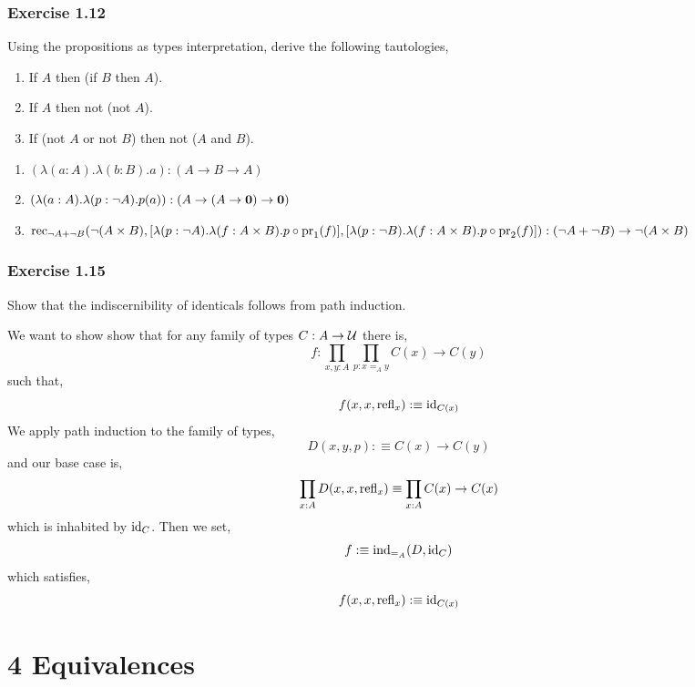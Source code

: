 \documentclass[12pt]{article}
\begin{document}
\subsubsection{Exercise 1.12}

\begin{exercise}
Using the propositions as types interpretation, derive the following tautologies,
\begin{enumerate}
\item If $A$ then (if $B$ then $A$).
\item If $A$ then not (not $A$).
\item If (not $A$ or not $B$) then not ($A$ and $B$).
\end{enumerate}
\end{exercise}

\begin{enumerate}
\item $(\lambda (a : A). \lambda (b : B). a) : (A \to B \to A)$
\item $(\lambda (a : A) . \lambda (p : \neg A) . p(a)) : (A \to (A \to \bf{0}) \to \bf{0})$
\item $\rec_{\neg A + \neg B}(\neg (A \times B), [\lambda (p : \neg A) . \lambda (f : A \times B) . p \circ \pr_1(f)], [\lambda (p : \neg B) . \lambda (f : A \times B) . p \circ \pr_2(f)]) : (\neg A + \neg B) \to \neg (A \times B)$
\end{enumerate}

\subsubsection{Exercise 1.15}

\begin{exercise}
Show that the indiscernibility of identicals follows from path induction.
\end{exercise}

We want to show show that for any family of types $C : A \to \U$ there is,
\[ f : \prod_{x,y : A} \prod_{p : x =_A y} C(x) \to C(y) \]
such that,
\[ f(x, x, \refl_x) :\equiv \id_{C(x)} \]
We apply path induction to the family of types,
\[ D(x,y,p) : \equiv C(x) \to C(y) \]
and our base case is,
\[ \prod_{x : A} D(x,x,\refl_x) \equiv \prod_{x : A} C(x) \to C(x) \]
which is inhabited by $\id_C$. Then we set,
\[ f :\equiv \ind_{=_A}(D, \id_C) \]
which satisfies,
\[ f(x,x,\refl_x) :\equiv \id_{C(x)} \]

\section{4 Equivalences}
\end{document}
